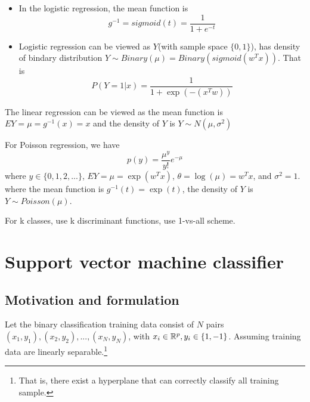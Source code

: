 \begin{refsection}
\begin{remark}\hfill
	\begin{itemize}
		\item In the logistic regression, the mean function is $$g^{-1} = sigmoid(t) = \frac{1}{1+e^{-t}}$$
		\item Logistic regression can be viewed as $Y$(with sample space $\{0,1\}$), has density of bindary distribution $Y\sim Binary(\mu) = Binary(sigmoid(w^Tx))$. That is
		$$P(Y=1 |x ) =  \frac{1}{1 + \exp(-(x^Tw))}$$ 
	\end{itemize}
\end{remark}

\begin{remark}
	The linear regression can be viewed as the mean function is $EY = \mu = g^{-1}(x) = x$ and the density of $Y$ is $Y\sim N(\mu,\sigma^2)$
\end{remark}

\begin{remark}
	For Poisson regression, we have
	$$p(y) = \frac{\mu^y}{y!}e^{-\mu}$$
	where $y \in \{0, 1, 2, ... \}$, $EY = \mu = \exp(w^Tx)$, $θ = \log(\mu) = w^Tx$, and $\sigma^2 = 1$.
	where the mean function is $g^{-1}(t) = \exp(t)$, the density of $Y$ is $Y\sim Poisson(\mu)$.	
\end{remark}


\begin{remark}
	For k classes, use k discriminant functions, use 1-vs-all scheme.	
\end{remark}



\section{Support vector machine classifier}


\subsection{Motivation and formulation}


\begin{definition}Let the binary classification training data consist of $N$ pairs $(x_1,y_1),(x_2,y_2),...,(x_N,y_N)$, with $x_i \in \mathbb{R}^p, y_i \in \{1,-1\}$. Assuming training data are linearly separable.\footnote{That is, there exist a hyperplane that can correctly classify all training sample.} 
	

\end{definition}
\end{refsection}
